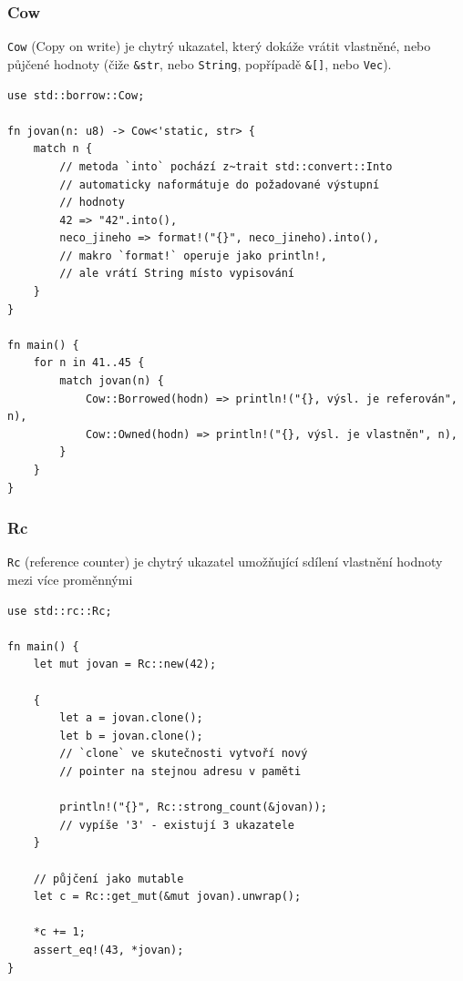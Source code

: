 \documentclass[a4paper, 12pt]{article} %
\newcommand{\rust}[1]{\texttt{#1}}
\begin{document}
            \subsubsection*{Cow}
                \rust{Cow} (Copy on write) je chytrý ukazatel, který dokáže vrátit vlastněné, nebo půjčené hodnoty (čiže \rust{&str}, nebo \rust{String}, popřípadě \rust{&[]}, nebo \rust{Vec}).
                \begin{verbatim}
use std::borrow::Cow;

fn jovan(n: u8) -> Cow<'static, str> {
    match n {
        // metoda `into` pochází z~trait std::convert::Into
        // automaticky naformátuje do požadované výstupní
        // hodnoty
        42 => "42".into(),
        neco_jineho => format!("{}", neco_jineho).into(),
        // makro `format!` operuje jako println!,
        // ale vrátí String místo vypisování
    }
}

fn main() {
    for n in 41..45 {
        match jovan(n) {
            Cow::Borrowed(hodn) => println!("{}, výsl. je referován", n),
            Cow::Owned(hodn) => println!("{}, výsl. je vlastněn", n),
        }
    }
}
                \end{verbatim}
                \cite{cow}


            \subsubsection*{Rc}
                \rust{Rc} (reference counter) je chytrý ukazatel umožňující sdílení vlastnění hodnoty mezi více proměnnými
            
                \begin{verbatim}
use std::rc::Rc;

fn main() {
    let mut jovan = Rc::new(42);

    {
        let a = jovan.clone();
        let b = jovan.clone();
        // `clone` ve skutečnosti vytvoří nový
        // pointer na stejnou adresu v paměti

        println!("{}", Rc::strong_count(&jovan));
        // vypíše '3' - existují 3 ukazatele
    }

    // půjčení jako mutable
    let c = Rc::get_mut(&mut jovan).unwrap();

    *c += 1;
    assert_eq!(43, *jovan);
}
                \end{verbatim}
            
\end{document}
